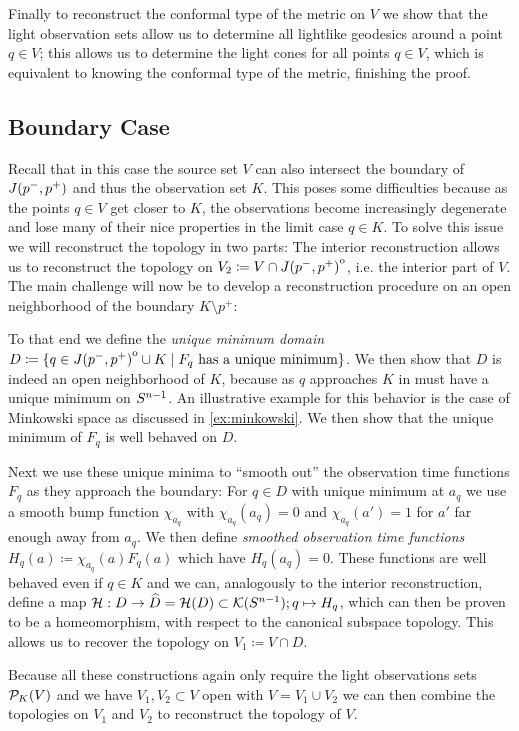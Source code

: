Finally to reconstruct the conformal type of the metric on $V$ we show that the light observation sets allow us to determine all lightlike geodesics around a point $q\in V$; this allows us to determine the light cones for all points $q\in V$, which is equivalent to knowing the conformal type of the metric, finishing the proof.

\subsection{Boundary Case}
Recall that in this case the source set $V$ can also intersect the boundary of $J(p^-,p^+)$ and thus the observation set $K$. This poses some difficulties because as the points $q\in V$ get closer to $K$, the observations become increasingly degenerate and lose many of their nice properties in the limit case $q\in K$.
 To solve this issue we will reconstruct the topology in two parts: The interior reconstruction allows us to reconstruct the topology on $V_2\coloneqq  V \cap {\kern0ptJ(p^-,p^+)}^{\mathrm{o}}$, i.e. the interior part of $V$. The main challenge will now be to develop a reconstruction procedure on an open neighborhood of the boundary $K\setminus p^+$:

To that end we define the \emph{unique minimum domain} $D\coloneqq \{q\in {\kern0ptJ(p^-,p^+)}^{\mathrm{o}}\cup K \mid F_q \text{ has a unique minimum}\}$. We then show that $D$ is indeed an open neighborhood of $K$, because as $q$ approaches $K$ in must have a unique minimum on ${S^{n-1}}$. An illustrative example for this behavior is the case of Minkowski space as discussed in \ref{ex:minkowski}. We then show that the unique minimum of $F_q$ is well behaved on $D$.

Next we use these unique minima to \enquote{smooth out} the observation time functions $F_q$ as they approach the boundary: For $q\in D$ with unique minimum at $a_q$ we use a smooth bump function $\chi_{a_q}$ with $\chi_{a_q}(a_q)=0$ and $\chi_{a_q}(a')=1$ for $a'$ far enough away from $a_q$. We then define \emph{smoothed observation time functions} $H_q(a)\coloneqq \chi_{a_q}(a)F_q(a)$ which have $H_q(a_q)=0$. These functions are well behaved even if $q\in K$ and we can, analogously to the interior reconstruction, define a map ${\mathcal{H}}:D\to \widehat{D} = {\mathcal{H}}(D)\subset {\mathcal{K}}({S^{n-1}}); q\mapsto H_q$, which can then be proven to be a homeomorphism, with respect to the canonical subspace topology. This allows us to recover the topology on $V_1\coloneqq  V\cap D$.

Because all these constructions again only require the light observations sets ${\mathcal{P}}_K(V)$ and we have $V_1, V_2\subset V$ open with $V=V_1\cup V_2$ we can then combine the topologies on $V_1$ and $V_2$ to reconstruct the topology of $V$.

